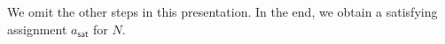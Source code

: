 



We omit the other steps in this presentation. In the end, we obtain a satisfying assignment $a_{\textsf{sat}}$ for $N$. 

